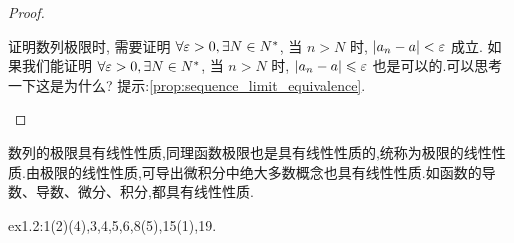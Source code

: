 \begin{proof}
\begin{enumerate}
        \begin{remark}
            证明数列极限时, 需要证明 $\forall \varepsilon > 0, \exists N \in N^*$, 当 $n > N$ 时, $|a_n - a| < \varepsilon$ 成立. 如果我们能证明 $\forall \varepsilon >0,  \exists N \in N^*$, 当 $n > N$ 时, $|a_n - a| \leqslant \varepsilon$ 也是可以的.可以思考一下这是为什么? 提示:\ref{prop:sequence_limit_equivalence}.
        \end{remark}
        

    \end{enumerate}
\end{proof}

数列的极限具有线性性质,同理函数极限也是具有线性性质的,统称为极限的线性性质.由极限的线性性质,可导出微积分中绝大多数概念也具有线性性质.如函数的导数、导数、微分、积分,都具有线性性质.

\begin{homework}
ex1.2:1(2)(4),3,4,5,6,8(5),15(1),19.
\end{homework}